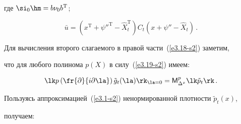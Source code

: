 где $\si_0 \hm= b \nu_0 b^{\mathrm{T}}$;

    \begin{equation*}

    \bar u =\left(x^{\mathrm{T}} +{\psi''}^{\mathrm{T}} -\hat X_t^{\mathrm{T}} \right) 

    C_t \left( x+\psi''-\hat X_t\right)\,.


    \end{equation*}



Для вычисления второго слагаемого в правой части~(\ref{e3.18-s2}) заметим,

что для любого полинома $p(X)$ в силу~(\ref{e3.19-s2}) имеем:

   \begin{equation*}

   \lk p\left(\fr{\partial}{i\partial \la}\right) \tilde g_t (\la)\rk_{\la=0} =

   {\sf M}_{\Delta^x}^p \lk\tilde{p}_t\rk\,.


   \end{equation*}

 Пользуясь аппроксимацией~(\ref{e3.1-s2}) ненормированной плотности  $\tilde p_t(x)$, 

 получаем:

